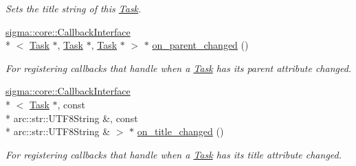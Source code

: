 \begin{DoxyCompactItemize}
\begin{DoxyCompactList}\small\item\em Sets the title string of this \hyperlink{classsigma_1_1core_1_1tasks_1_1_task}{Task}. \end{DoxyCompactList}\item 
\hyperlink{classsigma_1_1core_1_1_callback_interface}{sigma\-::core\-::\-Callback\-Interface}\\*
$<$ \hyperlink{classsigma_1_1core_1_1tasks_1_1_task}{Task} $\ast$, \hyperlink{classsigma_1_1core_1_1tasks_1_1_task}{Task} $\ast$, \hyperlink{classsigma_1_1core_1_1tasks_1_1_task}{Task} $\ast$ $>$ $\ast$ \hyperlink{classsigma_1_1core_1_1tasks_1_1_task_a4947e26b1208f36cf4bab3f2091db786}{on\-\_\-parent\-\_\-changed} ()
\begin{DoxyCompactList}\small\item\em For registering callbacks that handle when a \hyperlink{classsigma_1_1core_1_1tasks_1_1_task}{Task} has its parent attribute changed. \end{DoxyCompactList}\item 
\hyperlink{classsigma_1_1core_1_1_callback_interface}{sigma\-::core\-::\-Callback\-Interface}\\*
$<$ \hyperlink{classsigma_1_1core_1_1tasks_1_1_task}{Task} $\ast$, const \\*
arc\-::str\-::\-U\-T\-F8\-String \&, const \\*
arc\-::str\-::\-U\-T\-F8\-String \& $>$ $\ast$ \hyperlink{classsigma_1_1core_1_1tasks_1_1_task_adf2cc518f58adaa3d641d778d82a49c7}{on\-\_\-title\-\_\-changed} ()
\begin{DoxyCompactList}\small\item\em For registering callbacks that handle when a \hyperlink{classsigma_1_1core_1_1tasks_1_1_task}{Task} has its title attribute changed. \end{DoxyCompactList}\end{DoxyCompactItemize}

